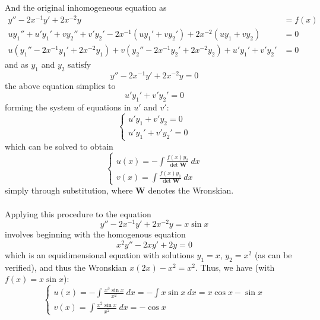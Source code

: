\documentclass{article}
\begin{document}
And the original inhomogeneous equation as 
\begin{equation*}
    \begin{aligned}
        y''-2x^{-1}y' + 2x^{-2}y &= f(x) \\
        uy_1'' + u'y_1' + vy_2'' + v'y_2' - 2x^{-1}(uy_1' + vy_2') + 2x^{-2}(uy_1 + vy_2) &= 0 \\
        u(y_1''-2x^{-1}y_1'+2x^{-2}y_1) + v(y_2''-2x^{-1}y_2'+2x^{-2}y_2) + u'y_1' + v'y_2' &= 0
    \end{aligned}
\end{equation*}
and as $y_1$ and $y_2$ satisfy
\begin{equation*}
    y''-2x^{-1}y'+2x^{-2}y = 0
\end{equation*}
the above equation simplies to
\begin{equation*}
    u'y_1' + v'y_2' = 0
\end{equation*}
forming the system of equations in $u'$ and $v'$:
\begin{equation*}
    \begin{cases}
        u'y_1 + v'y_2 = 0 \\
        u'y_1' + v'y_2' = 0
    \end{cases}
\end{equation*}
which can be solved to obtain 
\begin{equation*}
    \begin{cases}
        u(x) = -\int \frac{f(x) y_2}{\det \mathbf{W}}\ dx \\
        v(x) = \int \frac{f(x) y_1}{\det \mathbf{W}}\ dx
    \end{cases}
\end{equation*}
simply through substitution, where $\mathbf{W}$ denotes the Wronskian. \\ \\
Applying this procedure to the equation
\begin{equation*}
    y'' - 2x^{-1}y' + 2x^{-2}y = x \sin x
\end{equation*}
involves beginning with the homogenous equation
\begin{equation*}
    x^2y'' - 2xy' + 2y = 0
\end{equation*}
which is an equidimensional equation with solutions $y_1 = x$, $y_2 = x^2$ (as can be verified), and thus the Wronskian $x(2x) - x^2 = x^2$. Thus, we have (with $f(x) = x \sin x$):
\begin{equation*}
    \begin{cases}
        u(x) = -\int \frac{x^3 \sin x}{x^2}\ dx = -\int x\sin x\ dx = x\cos x - \sin x \\
        v(x) = \int \frac{x^2 \sin x}{x^2}\ dx = -\cos x
    \end{cases}
\end{equation*}
\end{document}
